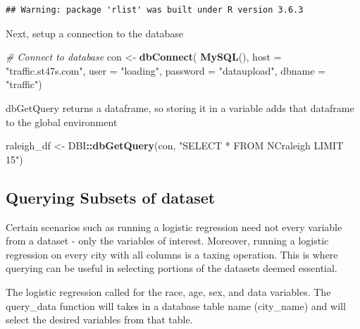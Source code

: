 \documentclass[
]{book}
\newenvironment{Shaded}{\begin{snugshade}}{\end{snugshade}}
\newcommand{\CommentTok}[1]{\textcolor[rgb]{0.56,0.35,0.01}{\textit{#1}}}
\newcommand{\DataTypeTok}[1]{\textcolor[rgb]{0.13,0.29,0.53}{#1}}
\newcommand{\KeywordTok}[1]{\textcolor[rgb]{0.13,0.29,0.53}{\textbf{#1}}}
\newcommand{\NormalTok}[1]{#1}
\newcommand{\OperatorTok}[1]{\textcolor[rgb]{0.81,0.36,0.00}{\textbf{#1}}}
\newcommand{\StringTok}[1]{\textcolor[rgb]{0.31,0.60,0.02}{#1}}
\begin{document}
\begin{verbatim}
## Warning: package 'rlist' was built under R version 3.6.3
\end{verbatim}

Next, setup a connection to the database

\begin{Shaded}
\begin{Highlighting}[]
\CommentTok{# Connect to database}
\NormalTok{con <-}\StringTok{ }\KeywordTok{dbConnect}\NormalTok{(}
  \KeywordTok{MySQL}\NormalTok{(), }\DataTypeTok{host =} \StringTok{"traffic.st47s.com"}\NormalTok{, }\DataTypeTok{user =} \StringTok{"loading"}\NormalTok{,}
  \DataTypeTok{password =} \StringTok{"dataupload"}\NormalTok{, }\DataTypeTok{dbname =} \StringTok{"traffic"}\NormalTok{)}
\end{Highlighting}
\end{Shaded}

dbGetQuery returns a dataframe, so storing it in a variable adds that dataframe to the global environment

\begin{Shaded}
\begin{Highlighting}[]
\NormalTok{raleigh_df <-}\StringTok{ }\NormalTok{DBI}\OperatorTok{::}\KeywordTok{dbGetQuery}\NormalTok{(con, }\StringTok{"SELECT * FROM NCraleigh LIMIT 15"}\NormalTok{)}
\end{Highlighting}
\end{Shaded}

\hypertarget{querying-subsets-of-dataset}{%
\subsection{Querying Subsets of dataset}\label{querying-subsets-of-dataset}}

Certain scenarios such as running a logistic regression need not every variable from a dataset - only the variables of interest. Moreover, running a logistic regression on every city with all columns is a taxing operation. This is where querying can be useful in selecting portions of the datasets deemed essential.

The logistic regression called for the race, age, sex, and data variables. The query\_data function will takes in a database table name (city\_name) and will select the desired variables from that table.
\end{document}
